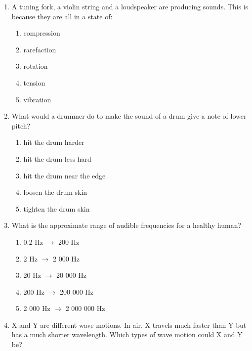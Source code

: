 \begin{enumerate}[noitemsep, label=\textbf{\arabic*}. ]
          \label{m38800*uid28}\item A tuning fork, a violin string and a loudspeaker are producing sounds. This is because they are all in a state of:
\label{m38800*id185988}\begin{enumerate}[noitemsep, label=\textbf{\alph*}. ] 
            \label{m38800*uid29}\item compression
\label{m38800*uid30}\item rarefaction
\label{m38800*uid31}\item rotation
\label{m38800*uid32}\item tension
\label{m38800*uid33}\item vibration
\end{enumerate}
                \label{m38800*uid34}\item What would a drummer do to make the sound of a drum give a note of lower pitch?
\label{m38800*id186066}\begin{enumerate}[noitemsep, label=\textbf{\alph*}. ] 
            \label{m38800*uid35}\item hit the drum harder
\label{m38800*uid36}\item hit the drum less hard
\label{m38800*uid37}\item hit the drum near the edge
\label{m38800*uid38}\item loosen the drum skin
\label{m38800*uid39}\item tighten the drum skin
\end{enumerate}
                \label{m38800*uid40}\item What is the approximate range of audible frequencies for a healthy human?
\label{m38800*id186144}\begin{enumerate}[noitemsep, label=\textbf{\alph*}. ] 
            \label{m38800*uid41}\item 0.2 Hz $\to $ 200 Hz
\label{m38800*uid42}\item 2 Hz $\to $ 2 000 Hz
\label{m38800*uid43}\item 20 Hz $\to $ 20 000 Hz
\label{m38800*uid44}\item 200 Hz $\to $ 200 000 Hz
\label{m38800*uid45}\item 2 000 Hz $\to $ 2 000 000 Hz
\end{enumerate}
                \label{m38800*uid46}\item X and Y are different wave motions. In air, X travels much faster than Y but has a much shorter wavelength. Which types of wave motion could X and Y be?

\end{enumerate}
